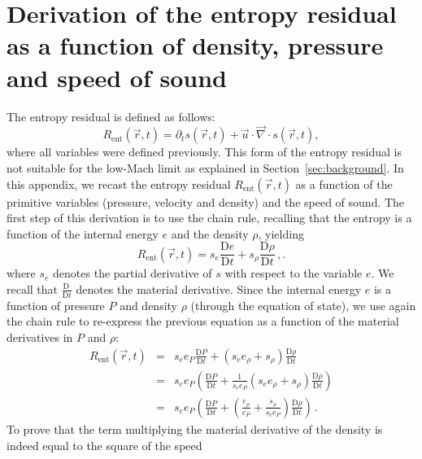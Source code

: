 \documentclass[preprint,10pt]{elsarticle}
\renewcommand{\div}{\vec{\nabla}\! \cdot \!}
\newcommand{\resi}{R_\text{ent}}
\newcommand{\matder}[1]{\frac{\textrm{D} #1}{\textrm{D} t}}
\newcommand{\sct}[1]{Section~\ref{#1}}                   %
\begin{document}
\section{Derivation of the entropy residual as a function of density, pressure and speed of sound} \label{app:ent_res}

The entropy residual is defined as follows:
%
\begin{equation*}
\resi(\vec{r},t) = \partial_t s (\vec{r},t) + \vec{u} \cdot \div s (\vec{r},t) ,
\end{equation*}
%
where all variables were defined previously. This form of the entropy residual is not suitable for the low-Mach 
limit as explained in \sct{sec:background}. In this appendix, we recast the entropy residual $\resi(\vec{r},t)$ 
as a function of the primitive variables (pressure, velocity and density) and the speed of sound. The first step 
of this derivation is to use the chain rule, recalling that the entropy is a function of the internal energy $e$ 
and the density $\rho$, yielding
%
\begin{equation*}
\resi(\vec{r},t) = s_e  \matder{e} + s_{\rho}  \matder{\rho} \,,.
\end{equation*}
%
where $s_e$ denotes the partial derivative of $s$ with respect to the variable $e$. We recall that $\matder{\ }$ 
denotes the material derivative. Since the internal energy $e$ is a function of pressure $P$ and density $\rho$ 
(through the equation of state), we use again the chain rule to re-express the previous equation as a function 
of the material derivatives in $P$ and $\rho$:
%
\begin{eqnarray*}
\resi(\vec{r},t) &=&  s_e e_P \matder{P} + ( s_e e_{\rho} + s_{\rho} ) \matder{\rho} \\
&=& s_e e_P \left( \matder{P} + \frac{1}{s_e e_P} ( s_e e_{\rho} + s_{\rho} )  \matder{\rho}\right) \\
&=& s_e e_P \left( \matder{P} + ( \frac{e_{\rho}}{e_P} + \frac{s_{\rho}}{s_e e_P} )  \matder{\rho} \right) \,.
\end{eqnarray*}
%
To prove that the term multiplying the material derivative of the density is indeed equal to the square of the speed 
\end{document}
